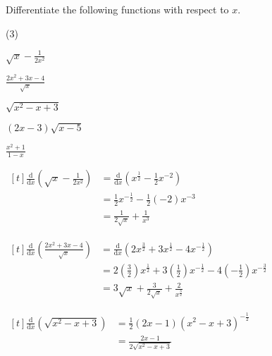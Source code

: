 \documentclass[11pt,a4paper]{book}
\begin{document}
\newpage


\begin{example}

Differentiate the following functions with respect to $x$.

\begin{tasks}[label=(\alph*),label-width=3.5ex](3)

\task ${\displaystyle \sqrt{x}-\frac{1}{2x^{2}}}$

\task $\frac{{\displaystyle 2x^{2}+3x-4}}{{\displaystyle \sqrt{x}}}$

\task $\sqrt{x^{2}-x+3}$

\task $\left(2x-3\right)\sqrt{x-5}$

\task ${\displaystyle \frac{x^{2}+1}{1-x}}$

\end{tasks}

\Solution

\begin{tasks}[label=(\alph*),label-width=3.5ex,after-item-skip = .5cm]

\task
$
\begin{aligned}[t]
{\displaystyle \frac{\mathrm{d}}{\mathrm{d}x}\left(\sqrt{x}-\frac{1}{2x^{2}}\right)} & =\frac{\mathrm{d}}{\mathrm{d}x}\left(x^{\frac{1}{2}}-\frac{1}{2}x^{-2}\right)\\
 & =\frac{1}{2}x^{-\frac{1}{2}}-\frac{1}{2}\left(-2\right)x^{-3}\\
 & =\frac{1}{2\sqrt{x}}+\frac{1}{x^{3}}
\end{aligned}
$

\task
$
\begin{aligned}[t]
{\displaystyle \frac{\mathrm{d}}{\mathrm{d}x}\left(\frac{{\displaystyle 2x^{2}+3x-4}}{{\displaystyle \sqrt{x}}}\right)} & =\frac{\mathrm{d}}{\mathrm{d}x}\left(2x^{\frac{3}{2}}+3x^{\frac{1}{2}}-4x^{-\frac{1}{2}}\right)\\
 & =2\left(\frac{3}{2}\right)x^{\frac{1}{2}}+3\left(\frac{1}{2}\right)x^{-\frac{1}{2}}-4\left(-\frac{1}{2}\right)x^{-\frac{3}{2}}\\
 & =3\sqrt{x}+\frac{3}{2\sqrt{x}}+\frac{2}{x^{\frac{3}{2}}}
\end{aligned}
$

\task
$
\begin{aligned}[t]
{\displaystyle \frac{\mathrm{d}}{\mathrm{d}x}\left(\sqrt{x^{2}-x+3}\right)} & =\frac{1}{2}\left(2x-1\right)\left(x^{2}-x+3\right)^{-\frac{1}{2}}\\
 & =\frac{2x-1}{2\sqrt{x^{2}-x+3}}
\end{aligned}
$


\end{tasks}
\end{example}
\end{document}
